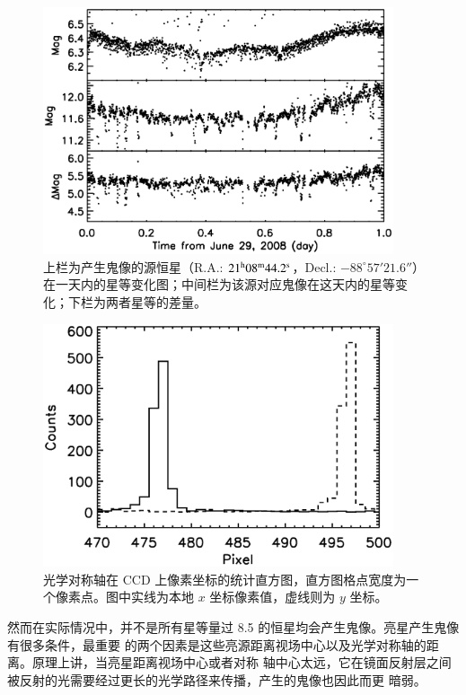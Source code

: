 \begin{figure}[h!]
\centering
\includegraphics[width=0.92\textwidth, trim={0.3cm 0.5cm 0 0}]{figures/chapter2/f6_starwghost.eps}
\caption{上栏为产生鬼像的源恒星（R.A.: $21^\mathrm{h}08^\mathrm{m}44.2^\mathrm{s}$，Decl.: $-88^{\circ}57'21.6''$）在一天内的星等变化图；中间栏为该源对应鬼像在这天内的星等变化；下栏为两者星等的差量。}
\label{fig:starwghost}
\end{figure}

\begin{figure}[h!]
\centering
\includegraphics[width=0.92\textwidth,trim={0.5cm 0.5cm 0 0}]{figures/chapter2/f7_opticaxispix.eps}
\caption{光学对称轴在 CCD 上像素坐标的统计直方图，直方图格点宽度为一个像素点。图中实线为本地 $x$ 坐标像素值，虚线则为 $y$ 坐标。}
\label{fig:opticaxispix}
\end{figure}

然而在实际情况中，并不是所有星等量过 8.5 的恒星均会产生鬼像。亮星产生鬼像有很多条件，最重要
的两个因素是这些亮源距离视场中心以及光学对称轴的距离。原理上讲，当亮星距离视场中心或者对称
轴中心太远，它在镜面反射层之间被反射的光需要经过更长的光学路径来传播，产生的鬼像也因此而更
暗弱。


